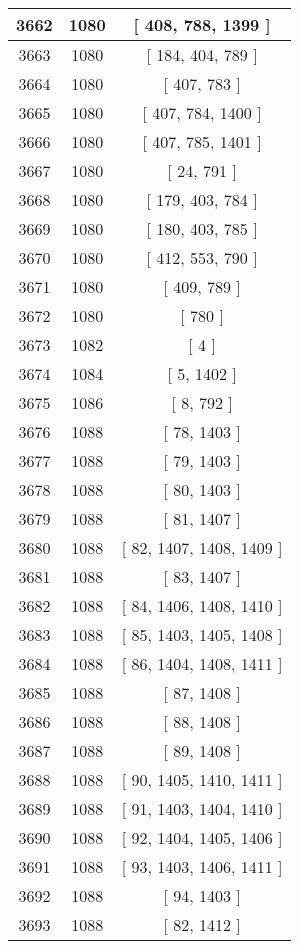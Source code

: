 \begin{center}
\begin{longtable}[H]{|| c c c ||}
\hline
3662 & 1080 & [ 408, 788, 1399 ] \\ 
\hline
3663 & 1080 & [ 184, 404, 789 ] \\ 
\hline
3664 & 1080 & [ 407, 783 ] \\ 
\hline
3665 & 1080 & [ 407, 784, 1400 ] \\ 
\hline
3666 & 1080 & [ 407, 785, 1401 ] \\ 
\hline
3667 & 1080 & [ 24, 791 ] \\ 
\hline
3668 & 1080 & [ 179, 403, 784 ] \\ 
\hline
3669 & 1080 & [ 180, 403, 785 ] \\ 
\hline
3670 & 1080 & [ 412, 553, 790 ] \\ 
\hline
3671 & 1080 & [ 409, 789 ] \\ 
\hline
3672 & 1080 & [ 780 ] \\ 
\hline
3673 & 1082 & [ 4 ] \\ 
\hline
3674 & 1084 & [ 5, 1402 ] \\ 
\hline
3675 & 1086 & [ 8, 792 ] \\ 
\hline
3676 & 1088 & [ 78, 1403 ] \\ 
\hline
3677 & 1088 & [ 79, 1403 ] \\ 
\hline
3678 & 1088 & [ 80, 1403 ] \\ 
\hline
3679 & 1088 & [ 81, 1407 ] \\ 
\hline
3680 & 1088 & [ 82, 1407, 1408, 1409 ] \\ 
\hline
3681 & 1088 & [ 83, 1407 ] \\ 
\hline
3682 & 1088 & [ 84, 1406, 1408, 1410 ] \\ 
\hline
3683 & 1088 & [ 85, 1403, 1405, 1408 ] \\ 
\hline
3684 & 1088 & [ 86, 1404, 1408, 1411 ] \\ 
\hline
3685 & 1088 & [ 87, 1408 ] \\ 
\hline
3686 & 1088 & [ 88, 1408 ] \\ 
\hline
3687 & 1088 & [ 89, 1408 ] \\ 
\hline
3688 & 1088 & [ 90, 1405, 1410, 1411 ] \\ 
\hline
3689 & 1088 & [ 91, 1403, 1404, 1410 ] \\ 
\hline
3690 & 1088 & [ 92, 1404, 1405, 1406 ] \\ 
\hline
3691 & 1088 & [ 93, 1403, 1406, 1411 ] \\ 
\hline
3692 & 1088 & [ 94, 1403 ] \\ 
\hline
3693 & 1088 & [ 82, 1412 ] \\ 

\end{longtable}
\end{center}
